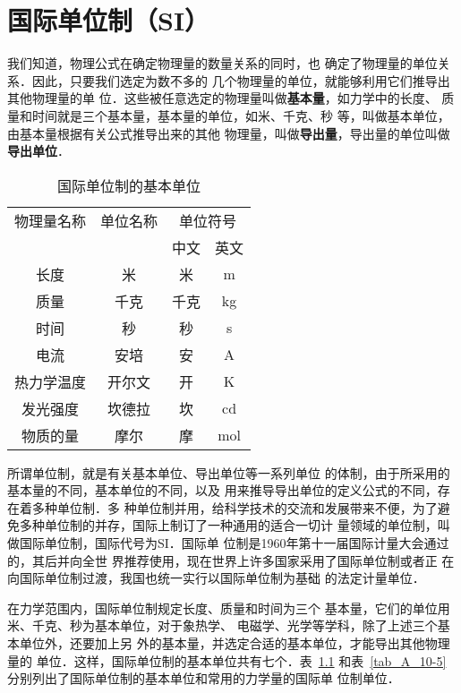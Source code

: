 \chapter{国际单位制（SI）}

我们知道，物理公式在确定物理量的数量关系的同时，也
确定了物理量的单位关系．因此，只要我们选定为数不多的
几个物理量的单位，就能够利用它们推导出其他物理量的单
位．这些被任意选定的物理量叫做\textbf{基本量}，如力学中的长度、
质量和时间就是三个基本量，基本量的单位，如米、千克、秒
等，叫做基本单位，由基本量根据有关公式推导出来的其他
物理量，叫做\textbf{导出量}，导出量的单位叫做\textbf{导出单位}．
\begin{table}[htbp]
    \centering
    \begin{tabular}{cccc}
        \hline
        物理量名称 & 单位名称 & \multicolumn{2}{c}{单位符号}\\
    	&&中文 & 英文\\
    	\hline
	    长度 & 米 & 米 & m\\
	    质量 & 千克 & 千克 &kg\\
	    时间 & 秒 & 秒 &s\\
	    电流 & 安培 & 安 &A\\ 
	    热力学温度 & 开尔文 & 开 &K\\ 
	    发光强度 & 坎德拉 & 坎 & cd\\
	    物质的量 & 摩尔 & 摩 & mol\\
	    \hline
    \end{tabular}
    \caption{国际单位制的基本单位}\label{tab_A_10-4}
\end{table}

所谓单位制，就是有关基本单位、导出单位等一系列单位
的体制，由于所采用的基本量的不同，基本单位的不同，以及
用来推导导出单位的定义公式的不同，存在着多种单位制．多
种单位制并用，给科学技术的交流和发展带来不便，为了避
免多种单位制的并存，国际上制订了一种通用的适合一切计
量领域的单位制，叫做国际单位制，国际代号为SI．国际单
位制是1960年第十一届国际计量大会通过的，其后并向全世
界推荐使用，现在世界上许多国家采用了国际单位制或者正
在向国际单位制过渡，我国也统一实行以国际单位制为基础
的法定计量单位．

在力学范围内，国际单位制规定长度、质量和时间为三个
基本量，它们的单位用米、千克、秒为基本单位，对于象热学、
电磁学、光学等学科，除了上述三个基本单位外，还要加上另
外的基本量，并选定合适的基本单位，才能导出其他物理量的
单位．这样，国际单位制的基本单位共有七个．表~\ref{tab_A_10-4} 和表~\ref{tab_A_10-5} 分别列出了国际单位制的基本单位和常用的力学量的国际单
位制单位．



